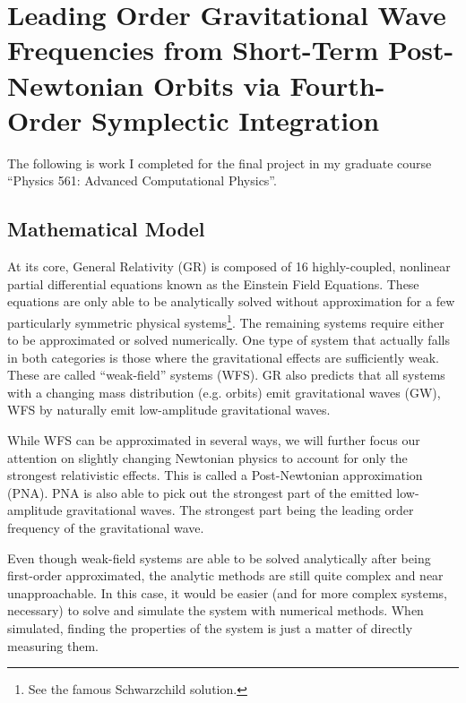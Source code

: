 \documentclass{report}
\begin{document}
\clearpage

    \section{Leading Order Gravitational Wave Frequencies from Short-Term Post-Newtonian Orbits via Fourth-Order Symplectic Integration}

        The following is work I completed for the final project in my graduate course ``Physics 561: Advanced Computational Physics''\cite{Chapman2022}.

        \subsection{Mathematical Model}

            At its core, General Relativity (GR) is composed of 16 highly-coupled, nonlinear partial differential equations known as the Einstein Field Equations.  These equations are only able to be analytically solved without approximation for a few particularly symmetric physical systems\footnote{See the famous Schwarzchild solution.}.  The remaining systems require either to be approximated or solved numerically.  One type of system that actually falls in both categories is those where the gravitational effects are sufficiently weak.  These are called ``weak-field'' systems (WFS).  GR also predicts that all systems with a changing mass distribution (e.g. orbits) emit gravitational waves (GW), WFS by naturally emit low-amplitude gravitational waves.

            While WFS can be approximated in several ways, we will further focus our attention on slightly changing Newtonian physics to account for only the strongest relativistic effects.  This is called a Post-Newtonian approximation (PNA).  PNA is also able to pick out the strongest part of the emitted low-amplitude gravitational waves.  The strongest part being the leading order frequency of the gravitational wave.

            Even though weak-field systems are able to be solved analytically after being first-order approximated, the analytic methods are still quite complex and near unapproachable.  In this case, it would be easier (and for more complex systems, necessary) to solve and simulate the system with numerical methods.  When simulated, finding the properties of the system is just a matter of directly measuring them.
\end{document}
